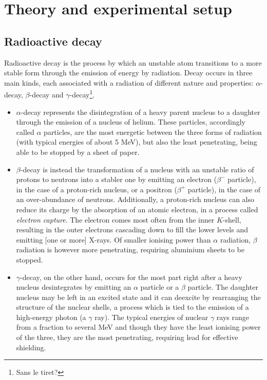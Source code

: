 \section{Theory and experimental setup}
\subsection{Radioactive decay}
Radioactive decay is the process by which an unstable atom transitions to a more stable form through the emission of energy by radiation.
Decay occurs in three main kinds, each associated with a radiation of different nature and properties: $\alpha$-decay, $\beta$-decay and $\gamma$-decay\footnote{Sans le tiret?}.
\begin{itemize}
    \item $\alpha$-decay represents the disintegration of a heavy parent nucleus to a daughter through the emission of a nucleus of helium.
    These particles, accordingly called $\alpha$ particles, are the most energetic between the three forms of radiation (with typical energies of about 5 MeV), but also the least penetrating, being able to be stopped by a sheet of paper.
    \item $\beta$-decay is instead the transformation of a nucleus with an unstable ratio of protons to neutrons into a stabler one by emitting an electron ($\beta^-$ particle), in the case of a proton-rich nucleus, or a positron ($\beta^+$ particle), in the case of an over-abundance of neutrons.
    Additionally, a proton-rich nucleus can also reduce its charge by the absorption of an atomic electron, in a process called \emph{electron capture}.
    The electron comes most often from the inner $K$-shell, resulting in the outer electrons cascading down to fill the lower levels and emitting [one or more] X-rays\cite{intro_nuclear_particle_physics}.
    Of smaller ionising power than $\alpha$ radiation, $\beta$ radiation is however more penetrating, requiring aluminium sheets to be stopped.
    \item $\gamma$-decay, on the other hand, occurs for the most part right after a heavy nucleus desintegrates by emitting an $\alpha$ particle or a $\beta$ particle.
    The daughter nucleus may be left in an excited state and it can deexcite by rearranging the structure of the nuclear shells, 
    a process which is tied to the emission of a high-energy photon (a $\gamma$ ray).
    The typical energies of nuclear $\gamma$ rays range from a fraction to several MeV 
    and though they have the least ionising power of the three, they are the most penetrating, requiring lead for effective shielding.
\end{itemize}

